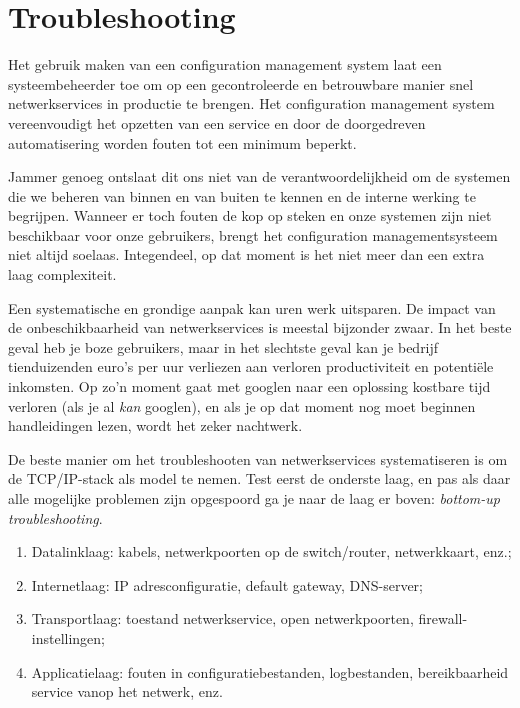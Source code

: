 \section{Troubleshooting}
\label{sec:troubleshooting-1}

Het gebruik maken van een configuration management system laat een systeembeheerder toe om op een gecontroleerde en betrouwbare manier snel netwerkservices in productie te brengen. Het configuration management system vereenvoudigt het opzetten van een service en door de doorgedreven automatisering worden fouten tot een minimum beperkt.

Jammer genoeg ontslaat dit ons niet van de verantwoordelijkheid om de systemen die we beheren van binnen en van buiten te kennen en de interne werking te begrijpen. Wanneer er toch fouten de kop op steken en onze systemen zijn niet beschikbaar voor onze gebruikers, brengt het configuration managementsysteem niet altijd soelaas. Integendeel, op dat moment is het niet meer dan een extra laag complexiteit.

Een systematische en grondige aanpak kan uren werk uitsparen. De impact van de onbeschikbaarheid van netwerkservices is meestal bijzonder zwaar. In het beste geval heb je boze gebruikers, maar in het slechtste geval kan je bedrijf tienduizenden euro's per uur verliezen aan verloren productiviteit en potentiële inkomsten. Op zo'n moment gaat met googlen naar een oplossing kostbare tijd verloren (als je al \emph{kan} googlen), en als je op dat moment nog moet beginnen handleidingen lezen, wordt het zeker nachtwerk.

De beste manier om het troubleshooten van netwerkservices systematiseren is om de TCP/IP-stack als model te nemen. Test eerst de onderste laag, en pas als daar alle mogelijke problemen zijn opgespoord ga je naar de laag er boven: \emph{bottom-up troubleshooting}.

\begin{enumerate}
  \item Datalinklaag: kabels, netwerkpoorten op de switch/router, netwerkkaart, enz.;
  \item Internetlaag: IP adresconfiguratie, default gateway, DNS-server;
  \item Transportlaag: toestand netwerkservice, open netwerkpoorten, firewall-instellingen;
  \item Applicatielaag: fouten in configuratiebestanden, logbestanden, bereikbaarheid service vanop het netwerk, enz.
\end{enumerate}

